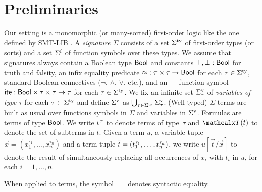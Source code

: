 \section{Preliminaries}
\label{sec:prelim}

Our setting is a monomorphic (or many-sorted) first-order logic
like the one defined by SMT-LIB \cite{smtlib25}.
A \emph{signature} $\Sigma$ consists of
a set $\stypes{\Sigma}$ of %
first-order types
%
(or sorts) and a set $\sfuns{\Sigma}$ of function symbols over these types.
We assume that signatures always contain a Boolean type $\Bool$ and constants
$\ltrue, \lfalse : \Bool$ for truth and falsity,
an infix equality predicate ${\teq} : \tau \times \tau \to \Bool$
for each $\tau \in \stypes{\Sigma}$,
standard Boolean connectives ($\neg$, $\wedge$, $\vee$, etc.),
and an ---- function symbol
$\lite : \Bool \times \tau \times \tau \rightarrow \tau$
for each $\tau \in \stypes{\Sigma}$.
%
We fix an infinite set $\svars{\Sigma}_\tau$ of \emph{variables of type $\tau$}
for each $\tau \in \stypes{\Sigma}$ and
define $\svars{\Sigma}$ as $\bigcup_{\tau \in \stypes{\Sigma}} \svars{\Sigma}_\tau$.
(Well-typed) $\Sigma$-terms are built as usual over functions symbols in $\Sigma$ and variables in $\svars{\Sigma}$.
%
Formulas are terms of type $\Bool$.
We write $t\typ{\tau}$ to denote %
terms of type~$\tau$ and $\terms( t )$ to denote the set of subterms in $t$.
Given a term $u$, a variable tuple $\vec x = (x_1^{\tau_1},\dotsc,x_n^{\tau_n})$ and 
a term tuple $\vec t = (t_{\smash{1}\vphantom{n}}^{\tau_1},\dotsc,t_n^{\tau_n})$, 
we write $u[\vec t/\vec x]$ to denote the result of simultaneously replacing
all occurrences of $x_i$ with $t_i$ in $u$, for each $i=1,\dotsc,n$.
\begin{rep}When applied to terms, the symbol $=$ denotes syntactic equality.\end{rep}


